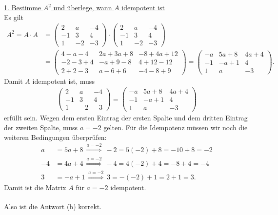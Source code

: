 \underline{1. Bestimme $ A^2 $ und überlege, wann $ A $ idempotent ist}\\
Es gilt
\begin{align*}
	A^2 = A \cdot A
	&=
	\begin{pmatrix}
		2 & a & -4 \\
		-1 & 3 & 4\\
		1 & -2 & -3
	\end{pmatrix}
	\cdot
	\begin{pmatrix}
		2 & a & -4 \\
		-1 & 3 & 4\\
		1 & -2 & -3
	\end{pmatrix}\\
	&=
	\begin{pmatrix}
		4-a-4 & 2a +3a+8 & -8+4a +12\\
		-2-3+4 & -a+9 -8 & 4 +12 -12\\
		2 +2 -3 & a-6 +6 & -4-8 + 9
	\end{pmatrix}
	=
	\begin{pmatrix}
		-a & 5a+8 & 4a +4\\
		-1 & -a+1 & 4 \\
		1 & a & -3
	\end{pmatrix}. 
\end{align*}
Damit $ A $ idempotent ist, muss
\begin{align*}
	\begin{pmatrix}
		2 & a & -4 \\
		-1 & 3 & 4\\
		1 & -2 & -3
	\end{pmatrix}
	=
	\begin{pmatrix}
		-a & 5a+8 & 4a +4\\
		-1 & -a+1 & 4 \\
		1 & a & -3
	\end{pmatrix}
\end{align*}
erfüllt sein. Wegen dem ersten Eintrag der ersten Spalte und dem dritten Eintrag der zweiten Spalte, muss $ a = -2 $ gelten. Für die Idempotenz müssen wir noch die weiteren Bedingungen überprüfen:
\begin{align*}
	a &= 5a +8 \ \overset{a=-2}{\Rightarrow} \
	-2 = 5 (-2) +8 = -10 +8 = -2\\
	-4 &= 4a +4 \ \overset{a=-2}{\Rightarrow} \
	-4 = 4 (-2) + 4 = -8 +4 = -4\\
	3 &= -a +1 \ \overset{a=-2}{\Rightarrow} \
	3 = -(-2) +1 = 2 +1 = 3.
\end{align*}
Damit ist die Matrix $ A $ für $ a=-2 $ idempotent.\\
\\
Also ist die Antwort (b) korrekt.
\newpage

